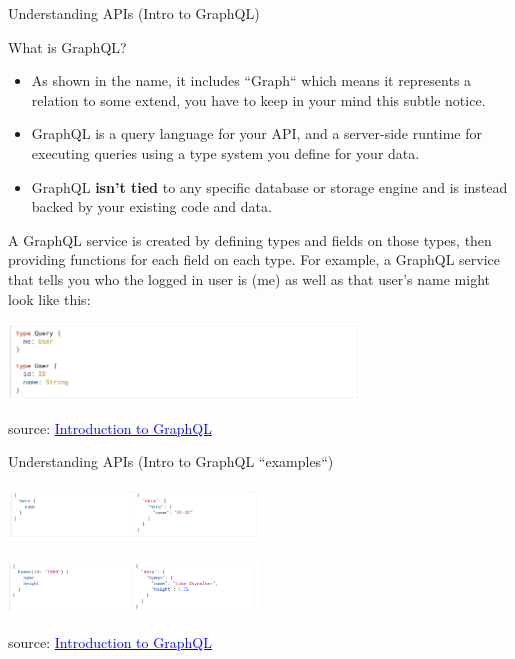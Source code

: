 \documentclass{beamer}
\begin{document}
\begin{frame}[t]{Understanding APIs \small (Intro to GraphQL)}
	\begin{block}{What is GraphQL?}
	\scriptsize
		\begin{itemize}
			\item<1> As shown in the name, it includes ``Graph`` which means it represents a relation to some extend, you have to keep in your mind this subtle notice.
			\item<1> GraphQL is a query language for your API, and a server-side runtime for executing queries using a type system you define for your data. 
			\item<1> GraphQL \textbf{isn't tied} to any specific database or storage engine and is instead backed by your existing code and data.		
		\end{itemize}
	\end{block}
	

	\begin{example}
		\tiny
		A GraphQL service is created by defining types and fields on those types, then providing functions for each field on each type. For example, a GraphQL service that tells you who the logged in user is (me) as well as that user's name might look like this:
	\end{example}
	\begin{center}
   		\includegraphics[width=0.7\textwidth, height=0.25\textheight]{img/graphql-example.png}
    \end{center}
    
    \tiny { source: \href{https://graphql.org/learn/}{\textcolor{blue}{Introduction to GraphQL}}}
  
\end{frame}

\begin{frame}[t]{Understanding APIs \small (Intro to GraphQL ``examples``)}
\center
	\begin{center}
   		\includegraphics[width=0.5\textwidth, height=0.25\textheight]{img/graphql-example-2.png}
    \end{center}
    
    \begin{center}
   		\includegraphics[width=0.5\textwidth, height=0.25\textheight]{img/graphql-example-3.png}
    \end{center}
    
    \tiny { source: \href{https://graphql.org/learn/}{\textcolor{blue}{Introduction to GraphQL}}}
\end{frame}
\end{document}
